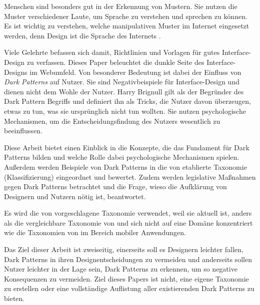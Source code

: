 \documentclass[conference,compsoc,final,a4paper]{IEEEtran}
\begin{document}
Menschen sind besonders gut in der Erkennung von Mustern. Sie nutzen die Muster verschiedener Laute, um Sprache zu verstehen und sprechen zu können. Es ist wichtig zu verstehen, welche manipulativen Muster im Internet eingesetzt werden, denn Design ist die Sprache des Internets \autocite{Nerdwriter1_YT_2018}.

Viele Gelehrte befassen sich damit, Richtlinien und Vorlagen für gutes Interface-Design zu verfassen. Dieses Paper beleuchtet die dunkle Seite des Interface-Designs im Webumfeld. Von besonderer Bedeutung ist dabei der Einfluss von \textit{Dark Patterns} auf Nutzer. Sie sind Negativbeispiele für Interface-Design und dienen nicht dem Wohle der Nutzer. Harry Brignull \autocite{Brignull} gilt als der Begründer des Dark Pattern Begriffs und definiert ihn als Tricks, die Nutzer davon überzeugen, etwas zu tun, was sie ursprünglich nicht tun wollten. Sie nutzen psychologische Mechanismen, um die Entscheidungsfindung des Nutzers wesentlich zu beeinflussen.

Diese Arbeit bietet einen Einblick in die Konzepte, die das Fundament für Dark Patterns bilden und welche Rolle dabei psychologische Mechanismen spielen. Außerdem werden Beispiele von Dark Patterns in die von \citeauthor{Gray_2018} \autocite{Gray_2018} etablierte Taxonomie (Klassifizierung) eingeordnet und bewertet. Zudem werden legislative Maßnahmen gegen Dark Patterns betrachtet und die Frage, wieso die Aufklärung von Designern und Nutzern nötig ist, beantwortet.

Es wird die von \citeauthor*{Gray_2018} \autocite{Gray_2018} vorgeschlagene Taxonomie verwendet, weil sie aktuell ist, anders als die vergleichbare Taxonomie von \citeauthor{Conti2010} \autocite{Conti2010} und sich nicht auf eine Domäne konzentriert wie die Taxonomien von \citeauthor{Lewis2014} \autocite{Lewis2014} im Bereich mobiler Anwendungen.


Das Ziel dieser Arbeit ist zweiseitig, einerseits soll es Designern leichter fallen, Dark Patterns in ihren Designentscheidungen zu vermeiden und anderseits sollen Nutzer leichter in der Lage sein, Dark Patterns zu erkennen, um so negative Konsequenzen zu vermeiden. Ziel dieses Papers ist nicht, eine eigene Taxonomie zu erstellen oder eine vollständige Auflistung aller existierenden Dark Patterns zu bieten.
\end{document}

